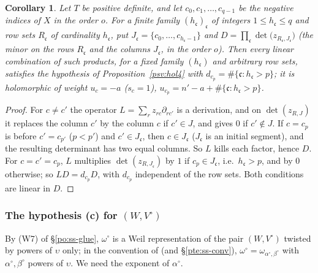 \documentclass[10pt]{amsart}
\newtheorem{corollary}[theorem]{Corollary}
\theoremstyle{definition}
\theoremstyle{remark}
\begin{document}
\begin{corollary}\label{psv:minors}
Let $T$ be positive definite, and let $c_0,c_1,\dots,c_{q-1}$ be the negative indices of $X$ in the
order $o$. For a finite family $(h_{\mathfrak c})_{\mathfrak c}$ of integers $1\le h_{\mathfrak c}\le q$ and row sets
$R_{\mathfrak c}$ of cardinality $h_{\mathfrak c}$, put $J_{\mathfrak c}=\{c_0,\dots,c_{h_{\mathfrak c}-1}\}$ and
$D=\prod_{\mathfrak c}\det\bigl(z_{R_{\mathfrak c},J_{\mathfrak c}}\bigr)$ \textup(the minor on the rows $R_{\mathfrak c}$ and the
columns $J_{\mathfrak c}$, in the order $o$\textup). Then every linear combination of such products, for a
fixed family $(h_{\mathfrak c})$ and arbitrary row sets, satisfies the hypothesis of
Proposition~\ref{psv:hol4} with $d_{c_p}=\#\{\mathfrak c:h_{\mathfrak c}>p\}$; it is holomorphic of weight
$u_c=-a$ \textup($s_c=1$\textup), $u_{c_p}=n'-a+\#\{\mathfrak c:h_{\mathfrak c}>p\}$.
\end{corollary}
\begin{proof}
For $c\ne c'$ the operator $L=\sum_rz_{rc}\partial_{rc'}$ is a derivation, and on $\det(z_{R,J})$ it replaces
the column $c'$ by the column $c$ if $c'\in J$, and gives $0$ if $c'\notin J$. If $c=c_p$ is before
$c'=c_{p'}$ ($p<p'$) and $c'\in J_{\mathfrak c}$, then $c\in J_{\mathfrak c}$ ($J_{\mathfrak c}$ is an initial segment), and the
resulting determinant has two equal columns. So $L$ kills each factor, hence $D$. For $c=c'=c_p$, $L$
multiplies $\det(z_{R,J_{\mathfrak c}})$ by $1$ if $c_p\in J_{\mathfrak c}$, i.e.\ $h_{\mathfrak c}>p$, and by $0$
otherwise; so $LD=d_{c_p}D$, with $d_{c_p}$ independent of the row sets. Both conditions are linear in
$D$.
\end{proof}

\subsubsection{The hypothesis (c) for $(W,V^\circ)$}\label{psv:ss-c}

By (W7) of \S\ref{po:ss-glue}, $\omega^\circ$ is a Weil representation of the pair $(W,V^\circ)$ twisted by
powers of $\upsilon$ only; in the convention of {\cite[\S2.3]{P53}} (and \S\ref{pte:ss-conv}),
$\omega^\circ=\omega_{\alpha^\circ,\beta^\circ}$ with $\alpha^\circ,\beta^\circ$ powers of $\upsilon$. We need the
exponent of $\alpha^\circ$.
\end{document}
